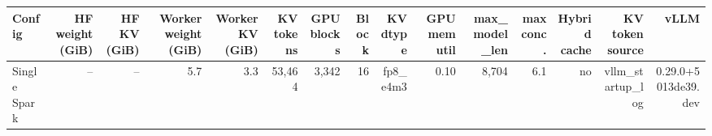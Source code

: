\begin{tabular}{l r r r r r r r r r r r r r r }
\toprule
Config & HF weight (GiB) & HF KV (GiB) & Worker weight (GiB) & Worker KV (GiB) & KV tokens & GPU blocks & Block & KV dtype & GPU mem util & max\_model\_len & max conc. & Hybrid cache & KV token source & vLLM \\
\midrule
Single Spark & -- & -- & 5.7 & 3.3 & 53,464 & 3,342 & 16 & fp8\_e4m3 & 0.10 & 8,704 & 6.1 & no & vllm\_startup\_log & 0.29.0+5013de39.dev \\
\bottomrule
\end{tabular}
